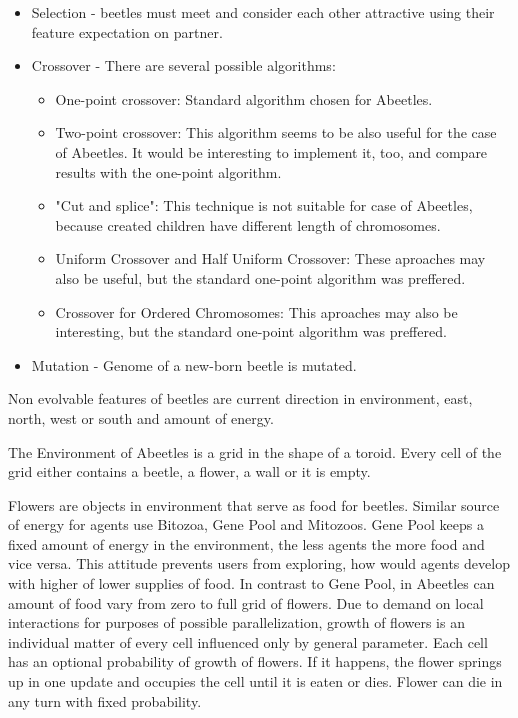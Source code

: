 \documentclass[a4paper,12pt]{report}
\begin{document}
\begin{itemize}
  \item Selection - beetles must meet and consider each other attractive using their feature expectation on partner. 
  \item Crossover - There are several possible algorithms:
    \begin{itemize}
      \item One-point crossover: Standard algorithm chosen for Abeetles.
      \item Two-point crossover: This algorithm seems to be also useful for the case of Abeetles. It would be interesting to implement it, too, and compare results with the one-point algorithm. 
      \item "Cut and splice": This technique is not suitable for case of Abeetles, because created children have different length of chromosomes.
      \item Uniform Crossover and Half Uniform Crossover: These aproaches may also be useful, but the standard one-point algorithm was preffered.
      \item Crossover for Ordered Chromosomes: This aproaches may also be interesting, but the standard one-point algorithm was preffered.
    \end {itemize}
  \item Mutation - Genome of a new-born beetle is mutated.
\end {itemize}



Non evolvable features of beetles are current direction in environment, east, north, west or south and amount of energy.

The Environment of Abeetles is a grid in the shape of a toroid. Every cell of the grid either contains a beetle, a flower, a wall or it is empty.

Flowers are objects in environment that serve as food for beetles. Similar source of energy for agents use Bitozoa, Gene Pool and Mitozoos. Gene Pool keeps a fixed amount of energy in the environment, the less agents the more food and vice versa. This attitude prevents users from exploring, how would agents develop with higher of lower supplies of food. In contrast to Gene Pool, in Abeetles can amount of food vary from zero to full grid of flowers. Due to demand on local interactions for purposes of possible parallelization, growth of flowers is an individual matter of every cell influenced only by general parameter. Each cell has an optional probability of growth of flowers. If it happens, the flower springs up in one update and occupies the cell until it is eaten or dies. Flower can die in any turn with fixed probability.  
\end{document}

